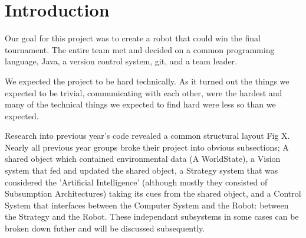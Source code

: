 \section{Introduction}

Our goal for this project was to create a robot that could win the final
tournament. The entire team met and decided on a common programming language,
Java, a version control system, git, and a team leader.

We expected the project to be hard technically. As it turned out the things we
expected to be trivial, communicating with each other, were the hardest and
many of the technical things we expected to find hard were less so than we
expected.

Research into previous year's code revealed a common structural layout Fig X. 
Nearly all previous year groups broke their project into obvious subsections; 
A shared object which contained environmental data (A WorldState), a Vision 
system that fed and updated the shared object, a Strategy system that was 
considered the 'Artificial Intelligence' (although mostly they consisted of 
Subsumption Architectures) taking its cues from the shared object, and a Control 
System that interfaces between the Computer System and the Robot: between the 
Strategy and the Robot. These independant subsystems in some cases can be broken 
down futher and will be discussed subsequently. 
